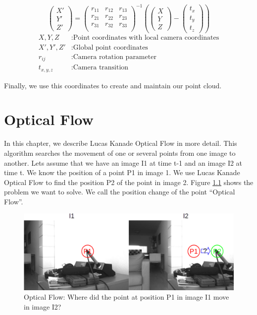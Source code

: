 \documentclass[11pt,a4paper,titlepage,oneside]{report}
\begin{document}
\begin{equation}\label{eq:depth_global}
  \begin{pmatrix}
    X'\\
    Y'\\
    Z'
  \end{pmatrix}=
  \begin{pmatrix}
    r_{11} & r_{12} & r_{13}\\
    r_{21} & r_{22} & r_{23}\\
    r_{31} & r_{32} & r_{33}\\
  \end{pmatrix}^{-1}
  \left(
  \begin{pmatrix}
    X\\
    Y\\
    Z
  \end{pmatrix}
  -\begin{pmatrix}
    t_x\\
    t_y\\
    t_z
  \end{pmatrix}
  \right)
\end{equation}
\begin{align*}
  X,Y,Z     &: \text{Point coordinates with local camera coordinates}\\
  X',Y',Z'  &: \text{Global point coordinates}\\
  r_{ij}    &: \text{Camera rotation parameter}\\
  t_{x,y,z} &: \text{Camera transition}
\end{align*}

Finally, we use this coordinates to create and maintain our point cloud.

\chapter{Optical Flow}\label{ch:opt_flow}

In this chapter, we describe Lucas Kanade Optical Flow in more detail. This algorithm searches the movement of one or several points from one image to another. Lets assume that we have an image I1 at time t-1 and an image I2 at time t. We know the position of a point P1 in image 1. We use Lucas Kanade Optical Flow to find the position P2 of the point in image 2. Figure \ref{fig:optical_flow} shows the problem we want to solve. We call the position change of the point ``Optical Flow''.

\begin{figure}[H]
  \includegraphics[width=1.0\textwidth]{img/optical_flow.png}
  \caption{Optical Flow: Where did the point at position P1 in image I1 move in image I2?}\label{fig:optical_flow}
\end{figure}
\end{document}
